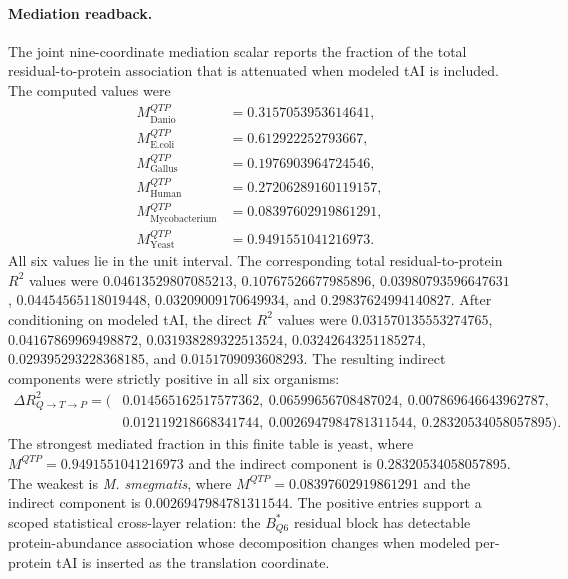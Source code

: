 \paragraph{Mediation readback.}
The joint nine-coordinate mediation scalar reports the fraction of the total residual-to-protein association that is attenuated when modeled tAI is included.  The computed values were
$$
\begin{aligned}
M^{QTP}_{\mathrm{Danio}}&=0.3157053953614641,\\
M^{QTP}_{\mathrm{E.coli}}&=0.612922252793667,\\
M^{QTP}_{\mathrm{Gallus}}&=0.1976903964724546,\\
M^{QTP}_{\mathrm{Human}}&=0.27206289160119157,\\
M^{QTP}_{\mathrm{Mycobacterium}}&=0.08397602919861291,\\
M^{QTP}_{\mathrm{Yeast}}&=0.9491551041216973.
\end{aligned}
$$
All six values lie in the unit interval.  The corresponding total residual-to-protein $R^2$ values were $0.04613529807085213$, $0.10767526677985896$, $0.03980793596647631$, $0.04454565118019448$, $0.03209009170649934$, and $0.29837624994140827$.  After conditioning on modeled tAI, the direct $R^2$ values were $0.031570135553274765$, $0.04167869969498872$, $0.031938289322513524$, $0.03242643251185274$, $0.029395293228368185$, and $0.0151709093608293$.  The resulting indirect components were strictly positive in all six organisms:
$$
\begin{aligned}
\Delta R^2_{Q\to T\to P}=(&0.014565162517577362,\ 0.06599656708487024,\ 0.007869646643962787,\\
&0.012119218668341744,\ 0.0026947984781311544,\ 0.28320534058057895).
\end{aligned}
$$
The strongest mediated fraction in this finite table is yeast, where $M^{QTP}=0.9491551041216973$ and the indirect component is $0.28320534058057895$.  The weakest is \emph{M. smegmatis}, where $M^{QTP}=0.08397602919861291$ and the indirect component is $0.0026947984781311544$.  The positive entries support a scoped statistical cross-layer relation: the $B^*_{Q6}$ residual block has detectable protein-abundance association whose decomposition changes when modeled per-protein tAI is inserted as the translation coordinate.

